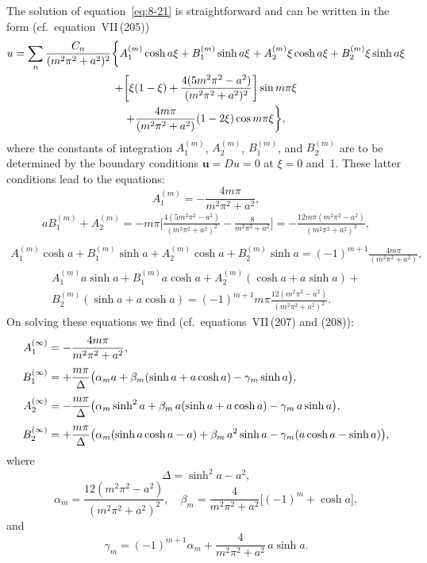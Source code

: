The solution of equation~\eqref{eq:8-21} is straightforward and can be written in the form (cf.\ equation~VII\,(205))
\begin{multline}
\label{eq:8-22}
u = \sum_n \frac{C_n}{(m^2\pi^2 + a^2)^2}\biggl\{A_1^{(m)}\cosh a\xi + B_1^{(m)}\sinh a\xi^{\vphantom{X}} + A_2^{(m)}\xi\cosh a\xi + B_2^{(m)}\xi\sinh a\xi \\
+ \biggl[\xi(1-\xi) + \frac{4(5m^2\pi^2 - a^2)}{(m^2\pi^2 + a^2)^2}\biggr]\sin m\pi\xi \\
+ \frac{4m\pi}{(m^2\pi^2 + a^2)}(1-2\xi)\cos m\pi\xi\biggr\},
\end{multline}
where the constants of integration $A_1^{(m)}$, $A_2^{(m)}$, $B_1^{(m)}$, and $B_2^{(m)}$ are to be determined by the boundary conditions $\mathbf{u} = Du = 0$ at $\xi = 0$ and~1. These latter conditions lead to the equations:
\begin{equation}
\label{eq:8-23}
A_1^{(m)} = -\frac{4m\pi}{m^2\pi^2 + a^2},
\end{equation}
\begin{multline}
\label{eq:8-23b}
aB_1^{(m)} + A_2^{(m)} = -m\pi\biggl[\frac{4(5m^2\pi^2 - a^2)}{(m^2\pi^2 + a^2)^2} - \frac{8}{m^2\pi^2 + a^2}\biggr] = -\frac{12m\pi(m^2\pi^2 - a^2)}{(m^2\pi^2 + a^2)^2}, \\
\end{multline}
\begin{multline}
\label{eq:8-23c}
A_1^{(m)}\cosh a + B_1^{(m)}\sinh a + A_2^{(m)}\cosh a + B_2^{(m)}\sinh a = (-1)^{m+1}\frac{4m\pi}{(m^2\pi^2 + a^2)},
\end{multline}
\begin{multline}
\label{eq:8-23d}
A_1^{(m)}a\sinh a + B_1^{(m)}a\cosh a + A_2^{(m)}(\cosh a + a\sinh a) + {} \\
B_2^{(m)}(\sinh a + a\cosh a) = (-1)^{m+1}m\pi\frac{12(m^2\pi^2 - a^2)}{(m^2\pi^2 + a^2)^2}.
\end{multline}
On solving these equations we find (cf.\ equations~VII\,(207) and (208)):
\begin{align}
\label{eq:8-24}
A_1^{(\infty)} &= -\frac{4m\pi}{m^2\pi^2 + a^2}, \notag\\[4pt]
B_1^{(\infty)} &= +\frac{m\pi}{\Delta}\bigl(\alpha_m a + \beta_m(\sinh a + a\cosh a) - \gamma_m\sinh a\bigr), \notag\\[4pt]
A_2^{(\infty)} &= -\frac{m\pi}{\Delta}\bigl(\alpha_m\sinh^2 a + \beta_m\,a(\sinh a + a\cosh a) - \gamma_m\,a\sinh a\bigr), \notag\\[4pt]
B_2^{(\infty)} &= +\frac{m\pi}{\Delta}\bigl(\alpha_m(\sinh a\cosh a - a) + \beta_m\,a^2\sinh a - \gamma_m(a\cosh a - \sinh a)\bigr),
\end{align}
where
\begin{equation}
\label{eq:8-25}
\Delta = \sinh^2 a - a^2,
\end{equation}
\begin{equation}
\label{eq:8-25b}
\alpha_m = \frac{12(m^2\pi^2 - a^2)}{(m^2\pi^2 + a^2)^2},\quad
\beta_m = \frac{4}{m^2\pi^2 + a^2}\bigl[(-1)^m + \cosh a\bigr],
\end{equation}
and
\begin{equation}
\label{eq:8-25c}
\gamma_m = (-1)^{m+1}\alpha_m + \frac{4}{m^2\pi^2 + a^2}\,a\sinh a.
\end{equation}

